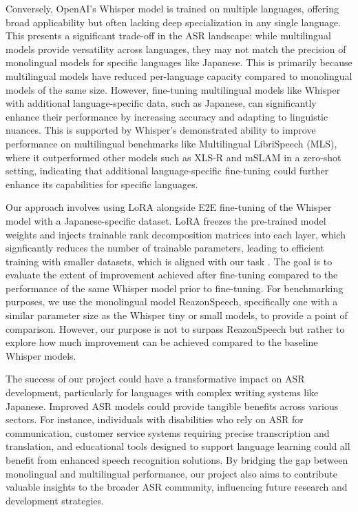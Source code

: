 \documentclass[10pt,twocolumn,letterpaper]{article}
\begin{document}
Conversely, OpenAI's Whisper model is trained on multiple languages\cite{radford2023robust}, offering broad applicability but often lacking deep specialization in any single language\cite{githubWhispermodelcardmdMain}. This presents a significant trade-off in the ASR landscape: while multilingual models provide versatility across languages, they may not match the precision of monolingual models for specific languages like Japanese. This is primarily because multilingual models have reduced per-language capacity compared to monolingual models of the same size. However, fine-tuning multilingual models like Whisper with additional language-specific data, such as Japanese, can significantly enhance their performance by increasing accuracy and adapting to linguistic nuances. This is supported by Whisper's demonstrated ability to improve performance on multilingual benchmarks like Multilingual LibriSpeech (MLS), where it outperformed other models such as XLS-R and mSLAM in a zero-shot setting, indicating that additional language-specific fine-tuning could further enhance its capabilities for specific languages\cite{radford2023robust}.


Our approach involves using LoRA \cite{huLoRALowRankAdaptation2021} alongside E2E fine-tuning of the Whisper model with a Japanese-specific dataset. LoRA freezes the pre-trained model weights and injects trainable rank decomposition matrices into each layer, which signficantly reduces the number of trainable parameters, leading to efficient training with smaller datasets, which is aligned with our task \cite{huLoRALowRankAdaptation2021}. The goal is to evaluate the extent of improvement achieved after fine-tuning compared to the performance of the same Whisper model prior to fine-tuning. For benchmarking purposes, we use the monolingual model ReazonSpeech\cite{githubReazonSpeech}, specifically one with a similar parameter size as the Whisper tiny or small models\cite{githubOpenaiWhisper}, to provide a point of comparison. However, our purpose is not to surpass ReazonSpeech but rather to explore how much improvement can be achieved compared to the baseline Whisper models.

The success of our project could have a transformative impact on ASR development, particularly for languages with complex writing systems like Japanese. Improved ASR models could provide tangible benefits across various sectors. For instance, individuals with disabilities who rely on ASR for communication, customer service systems requiring precise transcription and translation, and educational tools designed to support language learning could all benefit from enhanced speech recognition solutions. By bridging the gap between monolingual and multilingual performance, our project also aims to contribute valuable insights to the broader ASR community, influencing future research and development strategies.
\end{document}
